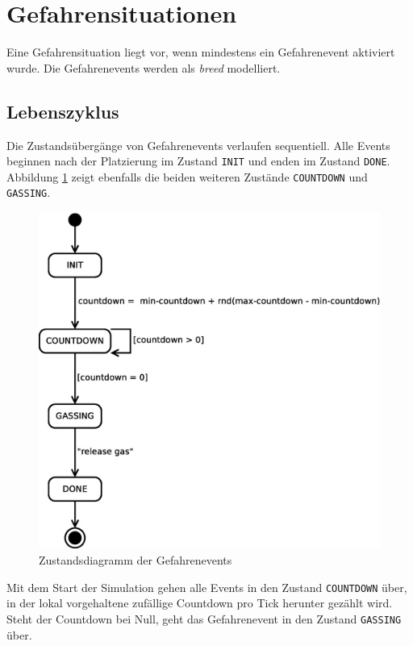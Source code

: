 
\section{Gefahrensituationen}
\label{sec:gefahrensituationen}

Eine Gefahrensituation liegt vor, wenn mindestens ein Gefahrenevent aktiviert wurde. Die Gefahrenevents werden als \emph{breed} modelliert. 

\subsection{Lebenszyklus}


Die Zustandsübergänge von Gefahrenevents verlaufen sequentiell. Alle Events beginnen nach der Platzierung im Zustand \verb|INIT| und enden im Zustand \verb|DONE|. Abbildung \ref{fig:event} zeigt ebenfalls die beiden weiteren Zustände \verb|COUNTDOWN| und \verb|GASSING|.

\begin{figure}[!ht]
\centering
\includegraphics[height=0.5\textwidth]{simulationsumgebung/event.eps}
\caption{Zustandsdiagramm der Gefahrenevents}
\label{fig:event}
\end{figure}

Mit dem Start der Simulation gehen alle Events in den Zustand \verb|COUNTDOWN| über, in der lokal vorgehaltene zufällige Countdown pro Tick herunter gezählt wird. Steht der Countdown bei Null, geht das Gefahrenevent in den Zustand \verb|GASSING| über.


